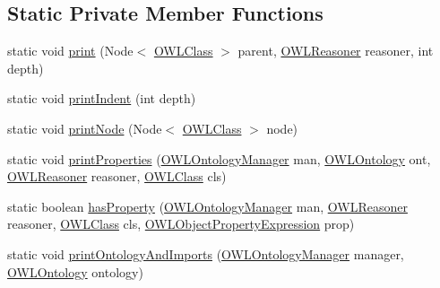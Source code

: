 \subsection*{Static Private Member Functions}
\begin{DoxyCompactItemize}
\item 
static void \hyperlink{classorg_1_1coode_1_1owlapi_1_1examples_1_1_examples_afbe119e3c01235f010533442baede0e5}{print} (Node$<$ \hyperlink{interfaceorg_1_1semanticweb_1_1owlapi_1_1model_1_1_o_w_l_class}{O\-W\-L\-Class} $>$ parent, \hyperlink{interfaceorg_1_1semanticweb_1_1owlapi_1_1reasoner_1_1_o_w_l_reasoner}{O\-W\-L\-Reasoner} reasoner, int depth)
\item 
static void \hyperlink{classorg_1_1coode_1_1owlapi_1_1examples_1_1_examples_ad21cb81013c24c86d08b2d9e7002ad88}{print\-Indent} (int depth)
\item 
static void \hyperlink{classorg_1_1coode_1_1owlapi_1_1examples_1_1_examples_a3edc40e1f5c231e77bf7502dfbd0a0c9}{print\-Node} (Node$<$ \hyperlink{interfaceorg_1_1semanticweb_1_1owlapi_1_1model_1_1_o_w_l_class}{O\-W\-L\-Class} $>$ node)
\item 
static void \hyperlink{classorg_1_1coode_1_1owlapi_1_1examples_1_1_examples_a0e62e9847bd3fc0394768cdc1d063e40}{print\-Properties} (\hyperlink{interfaceorg_1_1semanticweb_1_1owlapi_1_1model_1_1_o_w_l_ontology_manager}{O\-W\-L\-Ontology\-Manager} man, \hyperlink{interfaceorg_1_1semanticweb_1_1owlapi_1_1model_1_1_o_w_l_ontology}{O\-W\-L\-Ontology} ont, \hyperlink{interfaceorg_1_1semanticweb_1_1owlapi_1_1reasoner_1_1_o_w_l_reasoner}{O\-W\-L\-Reasoner} reasoner, \hyperlink{interfaceorg_1_1semanticweb_1_1owlapi_1_1model_1_1_o_w_l_class}{O\-W\-L\-Class} cls)
\item 
static boolean \hyperlink{classorg_1_1coode_1_1owlapi_1_1examples_1_1_examples_adc38d18ca796346a9a95be7f276ba6f3}{has\-Property} (\hyperlink{interfaceorg_1_1semanticweb_1_1owlapi_1_1model_1_1_o_w_l_ontology_manager}{O\-W\-L\-Ontology\-Manager} man, \hyperlink{interfaceorg_1_1semanticweb_1_1owlapi_1_1reasoner_1_1_o_w_l_reasoner}{O\-W\-L\-Reasoner} reasoner, \hyperlink{interfaceorg_1_1semanticweb_1_1owlapi_1_1model_1_1_o_w_l_class}{O\-W\-L\-Class} cls, \hyperlink{interfaceorg_1_1semanticweb_1_1owlapi_1_1model_1_1_o_w_l_object_property_expression}{O\-W\-L\-Object\-Property\-Expression} prop)
\item 
static void \hyperlink{classorg_1_1coode_1_1owlapi_1_1examples_1_1_examples_a743d626e68e66da29676f98708229470}{print\-Ontology\-And\-Imports} (\hyperlink{interfaceorg_1_1semanticweb_1_1owlapi_1_1model_1_1_o_w_l_ontology_manager}{O\-W\-L\-Ontology\-Manager} manager, \hyperlink{interfaceorg_1_1semanticweb_1_1owlapi_1_1model_1_1_o_w_l_ontology}{O\-W\-L\-Ontology} ontology)

\end{DoxyCompactItemize}
